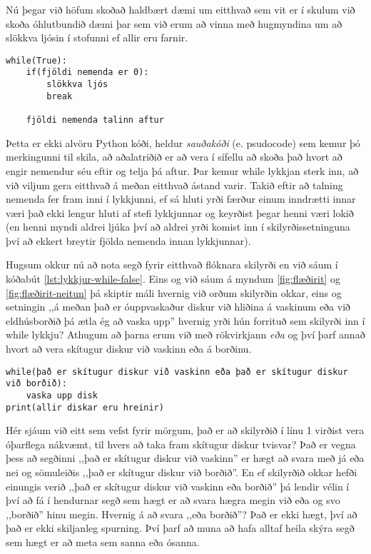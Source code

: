 Nú þegar við höfum skoðað haldbært dæmi um eitthvað sem vit er í skulum við skoða óhlutbundið dæmi þar sem við erum að vinna með hugmyndina um að slökkva ljósin í stofunni ef allir eru farnir.

\begin{lstlisting}
while(True):
	if(fjöldi nemenda er 0):
		slökkva ljós
		break
		
	fjöldi nemenda talinn aftur
\end{lstlisting}
\lstset{style=venjulegt}

Þetta er ekki alvöru Python kóði, heldur \emph{sauðakóði} (e. psudocode) sem kemur þó merkingunni til skila, að aðalatriðið er að vera í sífellu að skoða það hvort að engir nemendur séu eftir og telja þá aftur.
Þar kemur while lykkjan sterk inn, að við viljum gera eitthvað á meðan eitthvað ástand varir.
Takið eftir að talning nemenda fer fram inni í lykkjunni, ef sá hluti yrði færður einum inndrætti innar væri það ekki lengur hluti af stefi lykkjunnar og keyrðist þegar henni væri lokið (en henni myndi aldrei ljúka því að aldrei yrði komist inn í skilyrðissetninguna því að ekkert breytir fjölda nemenda innan lykkjunnar).

Hugsum okkur nú að nota segð fyrir eitthvað flóknara skilyrði en við sáum í kóðabút \ref{lst:lykkjur-while-false}.
Eins og við sáum á myndum \ref{fig:flæðirit} og \ref{fig:flæðirit-neitun} þá skiptir máli hvernig við orðum skilyrðin okkar, eins og setningin ,,á meðan það er óuppvaskaður diskur við hliðina á vaskinum eða við eldhúsborðið þá ætla ég að vaska upp'' hvernig yrði hún forrituð sem skilyrði inn í while lykkju?
Athugum að þarna erum við með rökvirkjann \emph{eða} og því þarf annað hvort að vera skítugur diskur við vaskinn eða á borðinu.
\begin{lstlisting}[caption=while lykkja óhlutbundin til að sýna rökvirkja, label=lst:lykkjur-while-or]
while(það er skítugur diskur við vaskinn eða það er skítugur diskur við borðið):
	vaska upp disk
print(allir diskar eru hreinir)
\end{lstlisting}
\lstset{style=venjulegt}

Hér sjáum við eitt sem vefst fyrir mörgum, það er að skilyrðið í línu 1 virðist vera óþarflega nákvæmt, til hvers að taka fram skítugur diskur tvisvar?
Það er vegna þess að segðinni ,,það er skítugur diskur við vaskinn'' er hægt að svara með já eða nei og sömuleiðis ,,það er skítugur diskur við borðið''.
En ef skilyrðið okkar hefði einungis verið ,,það er skítugur diskur við vaskinn eða borðið'' þá lendir vélin í því að fá í hendurnar segð sem hægt er að svara hægra megin við eða og svo ,,borðið'' hinu megin.
Hvernig á að svara ,,eða borðið''?
Það er ekki hægt, því að það er ekki skiljanleg spurning.
Því þarf að muna að hafa alltaf heila skýra segð sem hægt er að meta sem sanna eða ósanna.

